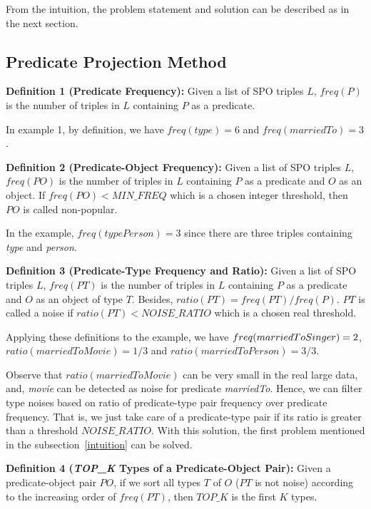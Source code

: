 \documentclass{acm_proc_article-sp}
\begin{document}
From the intuition, the problem statement and solution can be described as in the next section.

\subsection{Predicate Projection Method\\}

\textbf{Definition 1 (Predicate Frequency):} Given a list of SPO triples $L$, $freq(P)$ is the number of triples in $L$ containing $P$ as a predicate.

In example 1, by definition, we have $freq(type) = 6$ and $freq(marriedTo) = 3$.

\textbf{Definition 2 (Predicate-Object Frequency):} Given a list of SPO triples $L$, $freq(PO)$ is the number of triples in $L$ containing $P$ as a predicate and $O$ as an object. If $freq(PO) < MIN\_FREQ$ which is a chosen integer threshold, then $PO$ is called non-popular.

In the example, $freq(typePerson) = 3$ since there are three triples containing \textit{type} and \textit{person}.

\textbf{Definition 3 (Predicate-Type Frequency and Ratio):} Given a list of SPO triples $L$, $freq(PT)$ is the number of triples in $L$ containing $P$ as a predicate and $O$ as an object of type $T$. Besides, $ratio(PT) = freq(PT) / freq(P)$. $PT$ is called a noise if $ratio(PT) < NOISE\_RATIO$ which is a chosen real threshold.

Applying these definitions to the example, we have $freq\\(marriedToSinger) = 2$, $ratio(marriedToMovie) = 1 / 3$ and $ratio(marriedToPerson) = 3 / 3$.

Observe that $ratio(marriedToMovie)$ can be very small in the real large data, and, \textit{movie} can be detected as noise for predicate \textit{marriedTo}. Hence, we can filter type noises based on ratio of predicate-type pair frequency over predicate frequency. That is, we just take care of a predicate-type pair if its ratio is greater than a threshold $NOISE\_RATIO$. With this solution, the first problem mentioned in the subsection~\ref{intuition} can be solved.

\textbf{Definition 4 (\textit{TOP\_K} Types of a Predicate-Object Pair):} Given a predicate-object pair $PO$, if we sort all types $T$ of $O$ ($PT$ is not noise) according to the increasing order of $freq(PT)$, then $TOP\_K$ is the first $K$ types.
\end{document}
